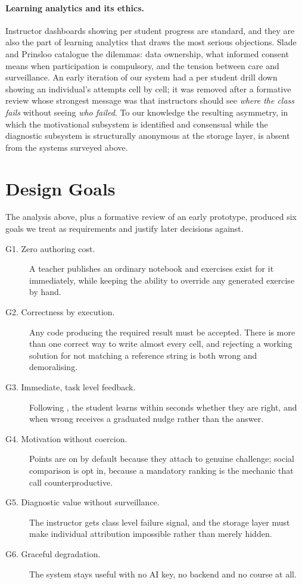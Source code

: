 \documentclass[manuscript]{acmart}
\begin{document}
\paragraph{Learning analytics and its ethics.}
Instructor dashboards showing per student progress are standard, and they are
also the part of learning analytics that draws the most serious objections.
Slade and Prinsloo \cite{slade2013learning} catalogue the dilemmas: data
ownership, what informed consent means when participation is compulsory, and
the tension between care and surveillance. An early iteration of our system had
a per student drill down showing an individual's attempts cell by cell; it was
removed after a formative review whose strongest message was that instructors
should see \emph{where the class fails} without seeing \emph{who failed}. To
our knowledge the resulting asymmetry, in which the motivational subsystem is
identified and consensual while the diagnostic subsystem is structurally
anonymous at the storage layer, is absent from the systems surveyed above.

\section{Design Goals}
\label{sec:goals}

The analysis above, plus a formative review of an early prototype, produced six
goals we treat as requirements and justify later decisions against.

\begin{description}
\item[G1. Zero authoring cost.] A teacher publishes an ordinary notebook and
exercises exist for it immediately, while keeping the ability to override any
generated exercise by hand.
\item[G2. Correctness by execution.] Any code producing the required result
must be accepted. There is more than one correct way to write almost every
cell, and rejecting a working solution for not matching a reference string is
both wrong and demoralising.
\item[G3. Immediate, task level feedback.] Following \cite{hattie2007power},
the student learns within seconds whether they are right, and when wrong
receives a graduated nudge rather than the answer.
\item[G4. Motivation without coercion.] Points are on by default because they
attach to genuine challenge; social comparison is opt in, because a mandatory
ranking is the mechanic that
\cite{sailer2020gamification,ryan2000selfdetermination} call counterproductive.
\item[G5. Diagnostic value without surveillance.] The instructor gets class
level failure signal, and the storage layer must make individual attribution
impossible rather than merely hidden.
\item[G6. Graceful degradation.] The system stays useful with no AI key, no
backend and no course at all.
\end{description}
\end{document}
